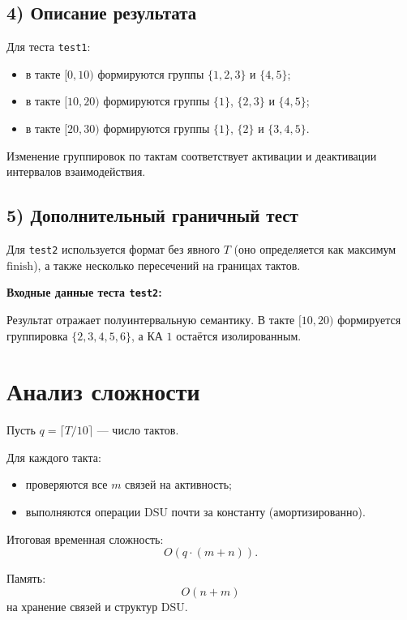 \documentclass[12pt,a4paper]{article}
\begin{document}
\subsection*{4) Описание результата}

Для теста \texttt{test1}:
\begin{itemize}
    \item в такте $[0,10)$ формируются группы $\{1, 2, 3\}$ и $\{4, 5\}$;
    \item в такте $[10,20)$ формируются группы $\{1\}$, $\{2, 3\}$ и $\{4, 5\}$;
    \item в такте $[20,30)$ формируются группы $\{1\}$, $\{2\}$ и $\{3, 4, 5\}$.
\end{itemize}
Изменение группировок по тактам соответствует активации и деактивации интервалов взаимодействия.

\subsection*{5) Дополнительный граничный тест}
Для \texttt{test2} используется формат без явного $T$ (оно определяется как максимум $\text{finish}$),
а также несколько пересечений на границах тактов.

\textbf{Входные данные теста \texttt{test2}:}

{\small
{}
}

Результат отражает полуинтервальную семантику.
В такте $[10,20)$ формируется группировка $\{2, 3, 4, 5, 6\}$,
а КА $1$ остаётся изолированным.

\section{Анализ сложности}
Пусть $q = \lceil T / 10 \rceil$ --- число тактов.

Для каждого такта:
\begin{itemize}
    \item проверяются все $m$ связей на активность;
    \item выполняются операции DSU почти за константу (амортизированно).
\end{itemize}

Итоговая временная сложность:
\[
O(q \cdot (m + n)).
\]

Память:
\[
O(n + m)
\]
на хранение связей и структур DSU.
\end{document}
